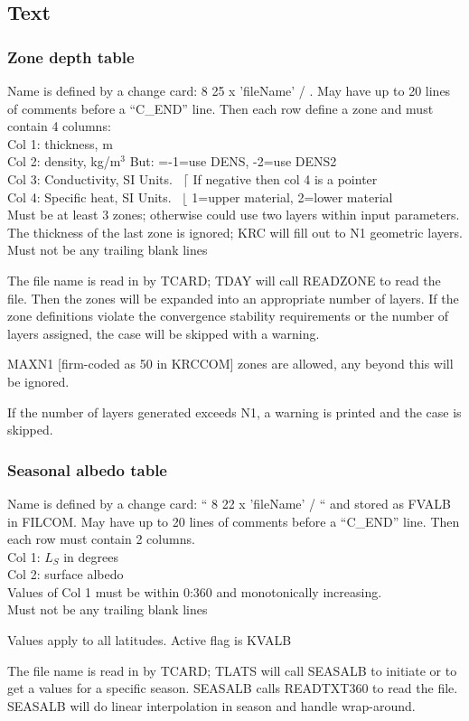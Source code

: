 \documentclass{article}
\newcommand{\qi}{\\ \hspace*{2.em}}      %
\begin{document}
\subsection{Text}
\subsubsection{Zone depth table}
Name is defined by a change card: 8 25 x 'fileName' / . May have up to 20 lines
of comments before a ``C_END'' line. Then each row define a zone and must
contain 4 columns:
\qi Col 1: thickness, m
\qi Col 2: density, kg/m$^3$ \hspace{2.0 cm} But: =-1=use DENS, -2=use DENS2
\qi Col 3: Conductivity, SI Units. \ $\lceil$   If negative then col 4 is a pointer
\qi Col 4: Specific heat, SI Units. \  $\lfloor$  1=upper material, 2=lower material
\\ Must be at least 3 zones; otherwise could use two layers within input parameters. 
\\ The thickness of the last zone is ignored; KRC will fill out to N1 geometric layers.
\\ Must not be any trailing blank lines

The file name is read in by TCARD; TDAY will call READZONE to read the
file. Then the zones will be expanded into an appropriate number of layers. If
the zone definitions violate the convergence stability requirements or the
number of layers assigned, the case will be skipped with a warning.

MAXN1 [firm-coded as 50 in KRCCOM] zones are allowed, any beyond this will be
ignored.

If the number of layers generated exceeds N1, a warning is printed and the case
is skipped.

\subsubsection{Seasonal albedo table}
Name is defined by a change card: `` 8 22 x 'fileName' / `` and stored as FVALB
in FILCOM. May have up to 20 lines of comments before a ``C_END'' line. Then
each row must contain 2 columns.
\qi Col 1: $L_S$ in degrees
\qi Col 2: surface albedo
\\ Values of Col 1 must be within 0:360 and monotonically increasing. 
\qi Must not be any trailing blank lines

Values apply to all latitudes. Active flag is KVALB

The file name is read in by TCARD; TLATS will call SEASALB to initiate or to get
a values for a specific season. SEASALB calls READTXT360 to read the
file. SEASALB will do linear interpolation in season and handle wrap-around.
\end{document}
